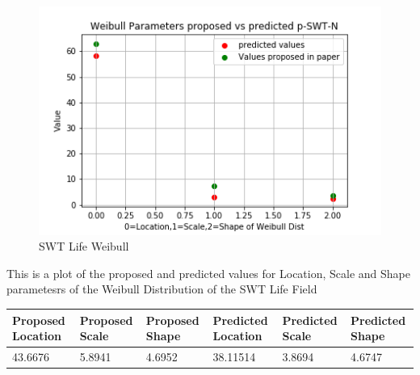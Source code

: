 \documentclass[11pt]{article}
\begin{document}
\begin{figure}
\centering
\includegraphics{images/PWMPlotswt.png}
\caption{SWT Life Weibull}
\end{figure}

This is a plot of the proposed and predicted values for Location, Scale
and Shape parametesrs of the Weibull Distribution of the SWT Life Field

\begin{longtable}[]{@{}llllll@{}}
\toprule
\begin{minipage}[b]{0.14\columnwidth}\raggedright
Proposed Location\strut
\end{minipage} & \begin{minipage}[b]{0.14\columnwidth}\raggedright
Proposed Scale\strut
\end{minipage} & \begin{minipage}[b]{0.14\columnwidth}\raggedright
Proposed Shape\strut
\end{minipage} & \begin{minipage}[b]{0.14\columnwidth}\raggedright
Predicted Location\strut
\end{minipage} & \begin{minipage}[b]{0.14\columnwidth}\raggedright
Predicted Scale\strut
\end{minipage} & \begin{minipage}[b]{0.14\columnwidth}\raggedright
Predicted Shape\strut
\end{minipage}\tabularnewline
\midrule
\endhead
\begin{minipage}[t]{0.14\columnwidth}\raggedright
43.6676\strut
\end{minipage} & \begin{minipage}[t]{0.14\columnwidth}\raggedright
5.8941\strut
\end{minipage} & \begin{minipage}[t]{0.14\columnwidth}\raggedright
4.6952\strut
\end{minipage} & \begin{minipage}[t]{0.14\columnwidth}\raggedright
38.11514\strut
\end{minipage} & \begin{minipage}[t]{0.14\columnwidth}\raggedright
3.8694\strut
\end{minipage} & \begin{minipage}[t]{0.14\columnwidth}\raggedright
4.6747\strut
\end{minipage}\tabularnewline
\bottomrule
\end{longtable}
\end{document}
